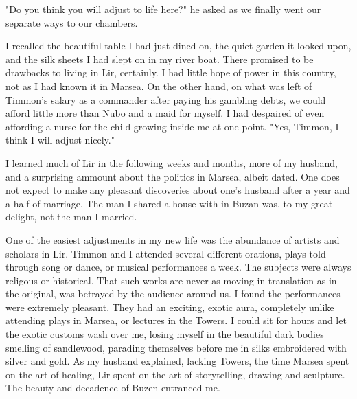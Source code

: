 \documentclass{article}
\begin{document}
"Do you think you will adjust to life here?" he asked as we finally went our separate ways to our chambers.

I recalled the beautiful table I had just dined on, the quiet garden it looked upon, and the silk sheets I had slept on in my river boat. There promised to be drawbacks to living in Lir, certainly. I had little hope of power in this country, not as I had known it in Marsea.  On the other hand, on what was left of Timmon's salary as a commander after paying his gambling debts, we could afford little more than Nubo and a maid for myself. I had despaired of even affording a nurse for the child growing inside me at one point. "Yes, Timmon, I think I will adjust nicely."

\vspace{.5cm}

I learned much of Lir in the following weeks and months, more of my husband, and a surprising ammount about the politics in Marsea, albeit dated. One does not expect to make any pleasant discoveries about one's husband after a year and a half of marriage. The man I shared a house with in Buzan was, to my great delight, not the man I married.

One of the easiest adjustments in my new life was the abundance of artists and scholars in Lir. Timmon and I attended several different orations, plays told through song or dance,  or musical performances a week. The subjects were always religous or historical. That such works are never as moving in translation as in the original, was betrayed by the audience around us. I found the performances were extremely pleasant. They had an exciting, exotic aura, completely unlike attending plays in Marsea, or lectures in the Towers. I could sit for hours and let the exotic customs wash over me, losing myself in the beautiful dark bodies smelling of sandlewood, parading themselves before me in silks embroidered with silver and gold. As my husband explained, lacking Towers, the time Marsea spent on the art of healing, Lir spent on the art of storytelling, drawing and sculpture. The beauty and decadence of Buzen entranced me. 
\end{document}
